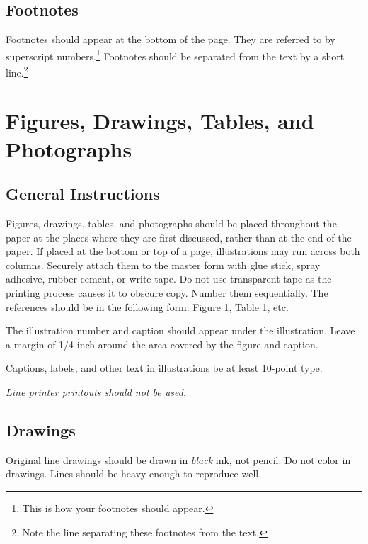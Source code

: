 \nocite{abelson-et-al:scheme}
\nocite{brachman-schmolze:kl-one}
\nocite{cheeseman:probability}
\nocite{haugeland:mind-design}
\nocite{lenat:heuristics}
\nocite{levesque:functional-foundations}
\nocite{levesque:belief}

\subsection{Footnotes}

Footnotes should appear at the bottom of the page.
They are referred to by superscript numbers.\footnote{This is how your
footnotes should appear.}
Footnotes should be separated from the text by a short line.\footnote{Note
the line separating these footnotes from the text.}

\section{Figures, Drawings, Tables, and Photographs}

\subsection{General Instructions}

Figures, drawings, tables, and photographs should be placed throughout
the paper at the places where they are first discussed, rather than at
the end of the paper.
If placed at the bottom or top of a page, illustrations may run across
both columns.
Securely attach them to the master form with glue stick, spray adhesive,
rubber cement, or write tape.
Do not use transparent tape as the printing process causes it to
obscure copy.
Number them sequentially.
The references should be in the following form:
Figure 1, Table 1, etc.

The illustration number and caption should appear under the
illustration. 
Leave a margin of 1/4-inch around the area covered by the
figure and caption.

Captions, labels, and other text in illustrations
be at least 10-point type.

{\em Line printer printouts should not be used.}

\subsection{Drawings}

Original line drawings should be drawn in {\em black\/} ink, not pencil.
Do not color in drawings.
Lines should be heavy enough to reproduce well.

